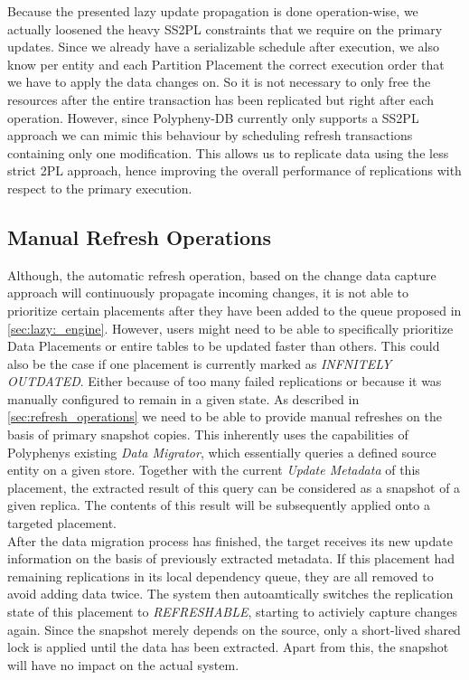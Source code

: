 Because the presented lazy update propagation is done operation-wise, we actually loosened the heavy SS2PL constraints that we require on the primary updates. 
Since we already have a serializable schedule after execution, we also know per entity and each Partition Placement 
the correct execution order that we have to apply the data changes on. So it is not necessary to only free the resources 
after the entire transaction has been replicated but right after each operation. 
However, since Polypheny-DB currently only supports a SS2PL approach we can 
mimic this behaviour by scheduling refresh transactions containing only one modification.
This allows us to replicate data using the less strict 2PL approach, hence improving the overall performance of replications with respect to the primary execution.



\subsection{Manual Refresh Operations}
\label{sec:manual_refresh}

Although, the automatic refresh operation, based on the change data capture approach will continuously propagate incoming changes,
it is not able to prioritize certain placements after they have been added to the queue proposed in \ref{sec:lazy:_engine}.
However, users might need to be able to specifically prioritize Data Placements or entire tables to be updated faster than others. 
This could also be the case if one placement is currently marked as \emph{INFNITELY OUTDATED}.
Either because of too many failed replications or because it was manually configured to remain in a given state. 
As described in \ref{sec:refresh_operations} we need to be able to provide manual refreshes on the basis of primary snapshot copies.
This inherently uses the capabilities of Polyphenys existing \emph{Data Migrator}, which essentially queries a defined source entity on a given store. 
Together with the current \emph{Update Metadata} of this placement, the extracted result of this query can be considered as a snapshot of a given replica.
The contents of this result will be subsequently applied onto a targeted placement.\\
After the data migration process has finished, the target receives its new update information on the basis of previously extracted metadata.
If this placement had remaining replications in its local dependency queue, they are all removed to avoid adding data twice. 
The system then autoamtically switches the replication state of this placement to \emph{REFRESHABLE}, starting to activiely capture changes again.
Since the snapshot merely depends on the source, only a short-lived shared lock is applied until the data has been extracted. Apart from this, the snapshot will have no impact
on the actual system.


